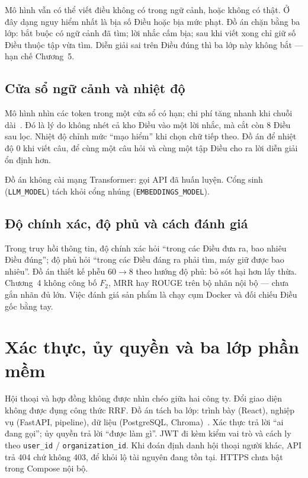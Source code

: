Mô hình vẫn có thể viết điều không có trong ngữ cảnh, hoặc không có thật. Ở
đây dạng nguy hiểm nhất là bịa số Điều hoặc bịa mức phạt. Đồ án chặn bằng ba
lớp: bắt buộc có ngữ cảnh đã tìm; lời nhắc cấm bịa; sau khi viết xong chỉ giữ
số Điều thuộc tập vừa tìm. Diễn giải sai trên Điều đúng thì ba lớp này không
bắt --- hạn chế Chương~5.

\subsection{Cửa sổ ngữ cảnh và nhiệt độ}

Mô hình nhìn các token trong một cửa sổ có hạn; chi phí tăng nhanh khi chuỗi
dài~\cite{vaswani2017}. Đó là lý do không nhét cả kho \soDieu{} Điều vào một
lời nhắc, mà cắt còn 8 Điều sau lọc. Nhiệt độ chỉnh mức ``mạo hiểm'' khi chọn
chữ tiếp theo. Đồ án để nhiệt độ 0 khi viết câu, để cùng một câu hỏi và cùng
một tập Điều cho ra lời diễn giải ổn định hơn.

Đồ án không cài mạng Transformer: gọi API đã huấn luyện. Cổng sinh
(\texttt{LLM\_MODEL}) tách khỏi cổng nhúng (\texttt{EMBEDDINGS\_MODEL}).

\subsection{Độ chính xác, độ phủ và cách đánh giá}

Trong truy hồi thông tin, độ chính xác hỏi ``trong các Điều đưa ra, bao nhiêu
Điều đúng''; độ phủ hỏi ``trong các Điều đáng ra phải tìm, máy giữ được bao
nhiêu''. Đồ án thiết kế phễu $60 \to 8$ theo hướng độ phủ: bỏ sót hại hơn lấy
thừa. Chương~4 không công bố $F_2$, MRR hay ROUGE trên bộ nhãn nội bộ --- chưa
gắn nhãn đủ lớn. Việc đánh giá sản phẩm là chạy cụm Docker và đối chiếu Điều
gốc bằng tay.

\section{Xác thực, ủy quyền và ba lớp phần mềm}

Hội thoại và hợp đồng không được nhìn chéo giữa hai công ty. Đổi giao diện không
được đụng công thức RRF. Đồ án tách ba lớp: trình bày (React), nghiệp vụ
(FastAPI, pipeline), dữ liệu (PostgreSQL, Chroma)~\cite{thanh2024}. Xác thực
trả lời ``ai đang gọi''; ủy quyền trả lời ``được làm gì''. JWT đi kèm kiểm vai
trò và cách ly theo \texttt{user\_id} / \texttt{organization\_id}. Khi đoán định
danh hội thoại người khác, API trả 404 chứ không 403, để khỏi lộ tài nguyên
đang tồn tại. HTTPS chưa bật trong Compose nội bộ.
